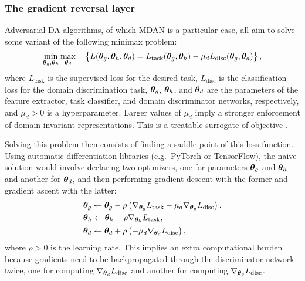 \subsubsection{The gradient reversal layer}
\label{sec:da_sensors_grad_rev}
Adversarial DA algorithms, of which MDAN is a particular case, all aim to solve some variant of the following minimax problem:
\begin{equation}
    \min_{{\bm{\theta}}_g, {\bm{\theta}}_h} \max_{{\bm{\theta}}_d} \quad \left \lbrace L({\bm{\theta}}_g, {\bm{\theta}}_h, {\bm{\theta}}_d) =  L_{\text{task}}({\bm{\theta}}_g, {\bm{\theta}}_h) - \mu_d L_{\text{disc}}({\bm{\theta}}_g, {\bm{\theta}}_d) \right \rbrace,
\end{equation}
where $L_{\text{task}}$ is the supervised loss for the desired task, $L_{\text{disc}}$ is the classification loss for the domain discrimination task, ${\bm{\theta}}_g$, ${\bm{\theta}}_h$, and ${\bm{\theta}}_d$ are the parameters of the feature extractor, task classifier, and domain discriminator networks, respectively, and $\mu_d > 0$ is a hyperparameter. Larger values of $\mu_d$ imply a stronger enforcement of domain-invariant representations. This is a treatable surrogate of objective .

Solving this problem then consists of finding a saddle point of this loss function. Using automatic differentiation libraries (e.g.\ PyTorch or TensorFlow), the naive solution would involve declaring two optimizers, one for parameters ${\bm{\theta}}_g$ and ${\bm{\theta}}_h$ and another for ${\bm{\theta}}_d$, and then performing gradient descent with the former and gradient ascent with the latter:
\begin{align}
    &{\bm{\theta}}_g \leftarrow {\bm{\theta}}_g - \rho \left(\nabla_{{\bm{\theta}}_g}L_{\text{task}} - \mu_d \nabla_{{\bm{\theta}}_g} L_{\text{disc}}\right), \label{eq:grad_feature_extractor}\\
    &{\bm{\theta}}_h \leftarrow {\bm{\theta}}_h - \rho \nabla_{{\bm{\theta}}_h}L_{\text{task}}, \label{eq:grad_task_class}\\
    &{\bm{\theta}}_d \leftarrow {\bm{\theta}}_d + \rho \left(-\mu_d \nabla_{{\bm{\theta}}_d}L_{\text{disc}}\right), \label{eq:grad_discriminator}
\end{align}
where $\rho>0$ is the learning rate. This implies an extra computational burden because gradients need to be backpropagated through the discriminator network twice, one for computing $\nabla_{{\bm{\theta}}_d} L_{\text{disc}}$ and another for computing $\nabla_{{\bm{\theta}}_g} L_{\text{disc}}$.

